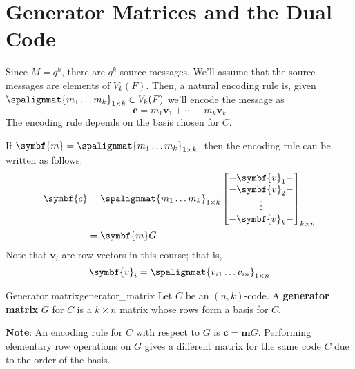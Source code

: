 \section{Generator Matrices and the Dual Code}

Since $ M=q^k $, there are $ q^k $ source messages. We'll assume that the source
messages are elements of $ V_k(F) $. Then, a natural encoding rule is,
given $ \spalignmat{m_1 \ldots{} m_k}_{1\times k}\in V_k(F) $ we'll encode the message as
\[ \symbf{c}=m_1\symbf{v}_1+\cdots+m_k\symbf{v}_k \]
The encoding rule depends on the basis chosen for $ C $.

If $ \symbf{m}=\spalignmat{m_1 \ldots{} m_k}_{1\times k} $,
then the encoding rule can be written as follows:
\begin{align*}
    \symbf{c} & =\spalignmat{m_1 \ldots{} m_k}_{1\times k}
    \begin{bmatrix}
        -\symbf{v}_1- \\
        -\symbf{v}_2- \\
        \vdots        \\
        -\symbf{v}_k-
    \end{bmatrix}_{k\times n}                 \\
              & =\symbf{m}G
\end{align*}
Note that $ \symbf{v}_i $ are row vectors in this course; that is,
\[ \symbf{v}_i=\spalignmat{v_{i1} \ldots{} v_{in}}_{1\times n} \]

\begin{Definition}{Generator matrix}{generator_matrix}
    Let $ C $ be an $ (n,k) $-code. A \textbf{generator matrix} $ G $
    for $ C $ is a $ k\times n $ matrix whose rows form a basis for $ C $.
\end{Definition}

\textbf{Note}: An encoding rule for $ C $ with respect to $ G $ is $ \symbf{c}=\symbf{m}G $.
Performing elementary row operations on $ G $ gives
a different matrix for the same code $ C $ due to the order of the basis.
